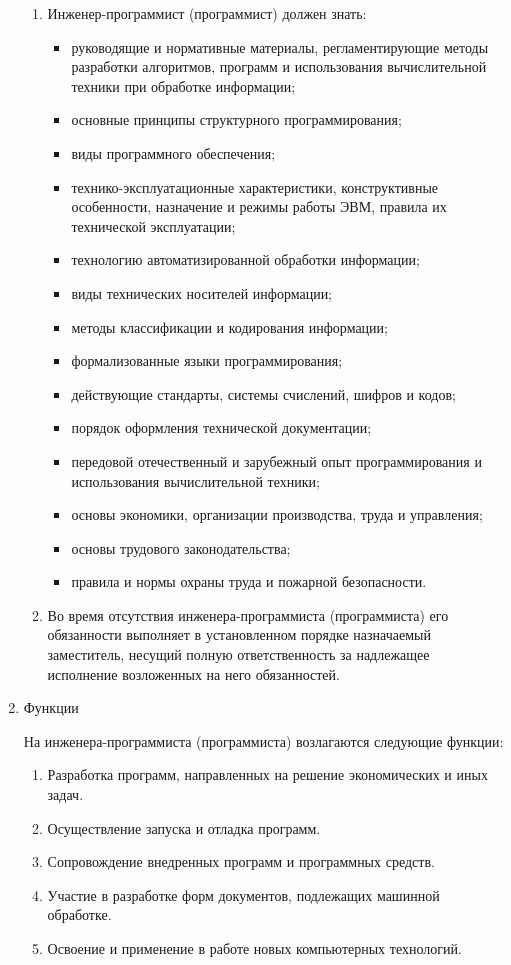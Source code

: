 \documentclass[12pt,a4paper,draft]{belgost/belgost}
\begin{document}
\begin{enumerate}
\begin{enumerate}
        \item Инженер-программист (программист) должен знать:
        \begin{itemize}
            \item руководящие и нормативные материалы, регламентирующие методы разработки алгоритмов, программ и использования вычислительной техники при обработке информации;
            \item основные принципы структурного программирования;
            \item виды программного обеспечения;
            \item технико-эксплуатационные характеристики, конструктивные особенности, назначение и режимы работы ЭВМ, правила их технической эксплуатации;
            \item технологию автоматизированной обработки информации;
            \item виды технических носителей информации;
            \item методы классификации и кодирования информации;
            \item формализованные языки программирования;
            \item действующие стандарты, системы счислений, шифров и кодов;
            \item порядок оформления технической документации;
            \item передовой отечественный и зарубежный опыт программирования и использования вычислительной техники;
            \item основы экономики, организации производства, труда и управления;
            \item основы трудового законодательства;
            \item правила и нормы охраны труда и пожарной безопасности.
        \end{itemize}

        \item Во время отсутствия инженера-программиста (программиста) его обязанности выполняет в установленном порядке назначаемый заместитель, несущий полную ответственность за надлежащее исполнение возложенных на него обязанностей.

    \end{enumerate}

    \item Функции

    На инженера-программиста (программиста) возлагаются следующие функции:
    \begin{enumerate}
        \item Разработка программ, направленных на решение экономических и иных задач.
        \item Осуществление запуска и отладка программ.
        \item Сопровождение внедренных программ и программных средств.
        \item Участие в разработке форм документов, подлежащих машинной обработке.
        \item Освоение и применение в работе новых компьютерных технологий.
    \end{enumerate}


\end{enumerate}
\end{document}
